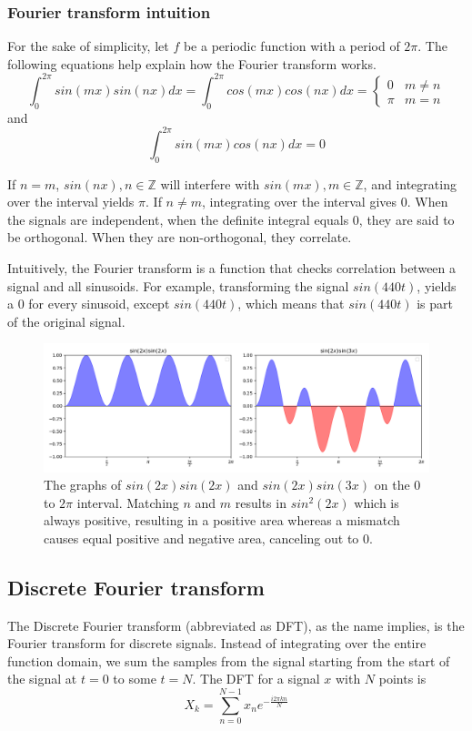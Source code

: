 \subsubsection{Fourier transform intuition}
For the sake of simplicity, let $f$ be a periodic function with a period of $2\pi$. The following equations help explain how the Fourier transform works.
\[ \int_0^{2\pi} sin(mx)sin(nx)dx = \int_0^{2\pi} cos(mx)cos(nx)dx= 
\begin{cases} %
    0 & m\neq n \\
    \pi & m=n
\end{cases} 
\]
\noindent and
$$\int_0^{2\pi} sin(mx)cos(nx)dx = 0$$

If $n = m $, $sin(nx), n\in\mathbb{Z}$ will interfere with $sin(mx), m\in\mathbb{Z}$, and integrating over the interval yields $\pi$. If $n \neq m$, integrating over the interval gives 0. When the signals are independent, when the definite integral equals 0, they are said to be orthogonal. When they are non-orthogonal, they correlate. 

Intuitively, the Fourier transform is a function that checks correlation between a signal and all sinusoids. For example, transforming the signal $sin(440t)$, yields a 0 for every sinusoid, except $sin(440t)$, which means that $sin(440t)$ is part of the original signal.

\begin{figure}[ht]
    \centering
    \includegraphics[width=\textwidth]{./images/transformIdea.png}
    \caption{The graphs of $sin(2x)sin(2x)$ and $sin(2x)sin(3x)$ on the $0$ to $2\pi$ interval. Matching $n$ and $m$ results in $sin^2(2x)$ which is always positive, resulting in a positive area whereas a mismatch causes equal positive and negative area, canceling out to 0.\label{fig:transformIdea}}
\end{figure}

\subsection{Discrete Fourier transform} 
The Discrete Fourier transform (abbreviated as DFT), as the name implies, is the Fourier transform for discrete signals. Instead of integrating over the entire function domain, we sum the samples from the signal starting from the start of the signal at $t=0$ to some $t=N$. The DFT for a signal $x$ with $N$ points is 
$$X_k = \sum_{n=0}^{N-1} x_ne^{-\frac{i2\pi kn}{N}}$$

